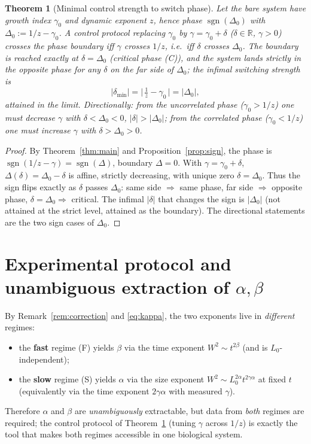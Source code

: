 \documentclass{amsart}
\newtheorem{theorem}{Theorem}
\theoremstyle{definition}
\newcommand{\asymp}{\sim}
\begin{document}
\begin{theorem}[Minimal control strength to switch phase]\label{thm:control}
Let the bare system have growth index $\gamma_0$ and dynamic exponent $z$, hence
phase $\operatorname{sgn}(\Delta_0)$ with $\Delta_0:=1/z-\gamma_0$. A control
protocol replacing $\gamma_0$ by $\gamma=\gamma_0+\delta$ ($\delta\in\mathbb R$,
$\gamma>0$) crosses the phase boundary iff $\gamma$ crosses $1/z$, i.e.\ iff
$\delta$ crosses $\Delta_0$. The boundary is reached exactly at $\delta=\Delta_0$
(critical phase (C)), and the system lands strictly in the opposite phase for any
$\delta$ on the far side of $\Delta_0$; the infimal switching strength is
\begin{equation}\label{eq:thresh}
  |\delta_{\min}|=\big|\,\tfrac1z-\gamma_0\,\big|=|\Delta_0|,
\end{equation}
attained in the limit. Directionally: from the uncorrelated phase
($\gamma_0>1/z$) one must \emph{decrease} $\gamma$ with
$\delta<\Delta_0<0$, $|\delta|>|\Delta_0|$; from the correlated phase
($\gamma_0<1/z$) one must \emph{increase} $\gamma$ with $\delta>\Delta_0>0$.
\end{theorem}
\begin{proof}
By Theorem~\ref{thm:main} and Proposition~\ref{prop:sign}, the phase is
$\operatorname{sgn}(1/z-\gamma)=\operatorname{sgn}(\Delta)$, boundary $\Delta=0$.
With $\gamma=\gamma_0+\delta$, $\Delta(\delta)=\Delta_0-\delta$ is affine,
strictly decreasing, with unique zero $\delta=\Delta_0$. Thus the sign flips
exactly as $\delta$ passes $\Delta_0$: same side $\Rightarrow$ same phase, far side
$\Rightarrow$ opposite phase, $\delta=\Delta_0\Rightarrow$ critical. The infimal
$|\delta|$ that changes the sign is $|\Delta_0|$ (not attained at the strict level,
attained as the boundary). The directional statements are the two sign cases of
$\Delta_0$.
\end{proof}

\section{Experimental protocol and unambiguous extraction of $\alpha,\beta$}
\label{sec:protocol}

By Remark~\ref{rem:correction} and \eqref{eq:kappa}, the two exponents live in
\emph{different} regimes:
\begin{itemize}
\item the \textbf{fast} regime (F) yields $\beta$ via the time exponent
  $W^2\asymp t^{2\beta}$ (and is $L_0$-independent);
\item the \textbf{slow} regime (S) yields $\alpha$ via the
  size exponent $W^2\asymp L_0^{2\alpha}t^{2\gamma\alpha}$ at fixed $t$ (equivalently
  via the time exponent $2\gamma\alpha$ with measured $\gamma$).
\end{itemize}
Therefore $\alpha$ and $\beta$ are \emph{unambiguously} extractable, but data from
\emph{both} regimes are required; the control protocol of
Theorem~\ref{thm:control} (tuning $\gamma$ across $1/z$) is exactly the tool that
makes both regimes accessible in one biological system.
\end{document}
